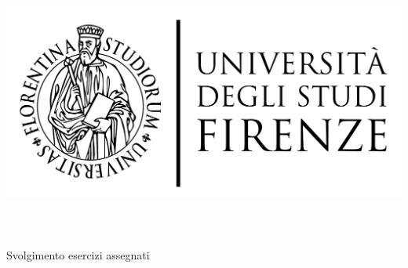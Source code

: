 \begin{titlepage}
	\begin{center}
   	\large
      \hfill
      \vfill
      \begingroup
         \includegraphics[scale=0.15]{logo/LOGO}\\
			\spacedallcaps{\myUni} \\ 
			\myFaculty \\
			\myDegree \\ 
			\vspace{0.5cm}
         \vspace{0.5cm}    
         Svolgimento esercizi assegnati    
      \endgroup 
      \vfill 
      \begingroup
      	\color{Maroon}\spacedallcaps{\myItalianTitle} \\ $\ $\\
	\bigskip
      \endgroup
      \spacedlowsmallcaps{\myName}
      \vfill 
      \vfill
      \emph{\myProf}
      \vfill
      \vfill
      \myTime
      \vfill                      
	\end{center}        
\end{titlepage}   
